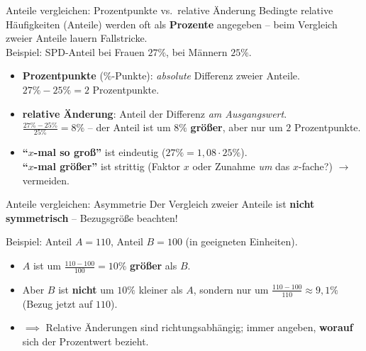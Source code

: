 \documentclass[
  10pt,
  ignorenonframetext,
]{beamer}
\providecommand{\tightlist}{%
  \setlength{\itemsep}{0pt}\setlength{\parskip}{0pt}}
\begin{document}
\begin{frame}{Anteile vergleichen: Prozentpunkte vs.~relative Änderung}
\protect\hypertarget{anteile-vergleichen-prozentpunkte-vs.-relative-uxe4nderung}{}
Bedingte relative Häufigkeiten (Anteile) werden oft als
\textbf{Prozente} angegeben -- beim Vergleich zweier Anteile lauern
Fallstricke.\\
Beispiel: SPD-Anteil bei Frauen \(27\%\), bei Männern \(25\%\).

\begin{itemize}[<+->]
\tightlist
\item
  \textbf{Prozentpunkte} (\(\%\)-Punkte): \emph{absolute} Differenz
  zweier Anteile.\\
  \(27\% - 25\% = 2\) Prozentpunkte.
\item
  \textbf{relative Änderung}: Anteil der Differenz \emph{am
  Ausgangswert}.\\
  \(\frac{27\% - 25\%}{25\%} = 8\%\) -- der Anteil ist um \(8\%\)
  \textbf{größer}, aber nur um \(2\) Prozentpunkte.
\item
  \textbf{``\(x\)-mal so groß''} ist eindeutig
  (\(27\% = 1{,}08 \cdot 25\%\)).\\
  \textbf{``\(x\)-mal größer''} ist strittig (Faktor \(x\) oder Zunahme
  \emph{um} das \(x\)-fache?) \(\longrightarrow\) vermeiden.
\end{itemize}
\end{frame}

\begin{frame}{Anteile vergleichen: Asymmetrie}
\protect\hypertarget{anteile-vergleichen-asymmetrie}{}
Der Vergleich zweier Anteile ist \textbf{nicht symmetrisch} --
Bezugsgröße beachten!

Beispiel: Anteil \(A = 110\), Anteil \(B = 100\) (in geeigneten
Einheiten).

\begin{itemize}[<+->]
\tightlist
\item
  \(A\) ist um \(\frac{110-100}{100} = 10\%\) \textbf{größer} als \(B\).
\item
  Aber \(B\) ist \textbf{nicht} um \(10\%\) kleiner als \(A\), sondern
  nur um \(\frac{110-100}{110} \approx 9{,}1\%\) (Bezug jetzt auf
  \(110\)).
\item
  \(\implies\) Relative Änderungen sind richtungsabhängig; immer
  angeben, \textbf{worauf} sich der Prozentwert bezieht.
\end{itemize}
\end{frame}
\end{document}
